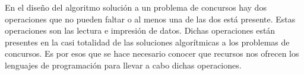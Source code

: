 En el diseño del algoritmo solución a un problema de concursos hay dos operaciones que no pueden faltar o al menos una de las dos está presente. Estas operaciones son las lectura e impresión de datos. Dichas operaciones están presentes en la casi totalidad de las soluciones algorítmicas a los problemas de concursos. Es por esos que se hace necesario conocer que recursos nos ofrecen los lenguajes de programación para llevar a cabo dichas operaciones.

 